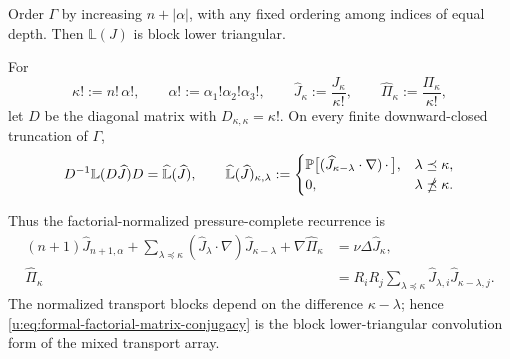 \begin{proposition}
Order \(\Gamma\) by increasing \(n+|\alpha|\), with any fixed ordering among
indices of equal depth.  Then \(\mathbb L(J)\) is block lower triangular.
\begin{samepage}
For
\[
 \kappa!:=n!\,\alpha!,
 \qquad
 \alpha!:=\alpha_1!\alpha_2!\alpha_3!,
 \qquad
 \widehat J_\kappa:=\frac{J_\kappa}{\kappa!},
 \qquad
 \widehat\Pi_\kappa:=\frac{\Pi_\kappa}{\kappa!},
\]
let \(D\) be the diagonal matrix with \(D_{\kappa,\kappa}=\kappa!\).  On
every finite downward-closed truncation of \(\Gamma\),
\begin{equation}
 D^{-1}\mathbb L(D\widehat J)D
 =\widehat{\mathbb L}(\widehat J),
 \qquad
 \widehat{\mathbb L}(\widehat J)_{\kappa,\lambda}
 :=
 \begin{cases}
 \mathbb P\bigl[(\widehat J_{\kappa-\lambda}\cdot\nabla)
            \,\mathord\cdot\,\bigr],
 &\lambda\preceq\kappa,\\
 0,&\lambda\npreceq\kappa.
 \end{cases}
 \label{u:eq:formal-factorial-matrix-conjugacy}
\end{equation}
\end{samepage}
Thus the factorial-normalized pressure-complete recurrence is
\begin{align}
 (n+1)\widehat J_{n+1,\alpha}
 +\sum_{\lambda\preceq\kappa}
   (\widehat J_\lambda\cdot\nabla)
   \widehat J_{\kappa-\lambda}
 +\nabla\widehat\Pi_\kappa
 &=\nu\Delta\widehat J_\kappa,
 \label{u:eq:formal-factorial-velocity-convolution}\\
 \widehat\Pi_\kappa
 &=R_iR_j\sum_{\lambda\preceq\kappa}
   \widehat J_{\lambda,i}\widehat J_{\kappa-\lambda,j}.
 \label{u:eq:formal-factorial-pressure-convolution}
\end{align}
The normalized transport blocks depend on the difference
\(\kappa-\lambda\); hence \eqref{u:eq:formal-factorial-matrix-conjugacy} is the
block lower-triangular convolution form of the mixed transport array.
\end{proposition}

